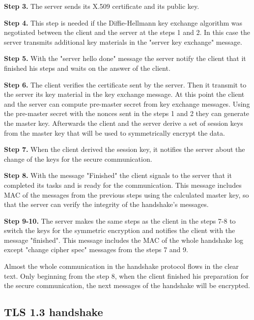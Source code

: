 \textbf{Step 3.} The server sends its X.509 certificate and its public key.

\textbf{Step 4.} This step is needed if the Diffie-Hellmann key exchange algorithm was negotiated between the client and the server at the steps 1 and 2. In this case the server transmits additional key materials in the "server key exchange" message.

\textbf{Step 5.} With the "server hello done" message the server notify the client that it finished his steps and waits on the answer of the client.

\textbf{Step 6.} The client verifies the certificate sent by the server. Then it transmit to the server its key material in the key exchange message. 
At this point the client and the server can compute pre-master secret from key exchange messages. Using the pre-master secret with the nonces sent in the steps 1 and 2 they can generate the master key. Afterwards the client and the server derive a set of session keys from the master key that will be used to symmetrically encrypt the data.

\textbf{Step 7.} When the client derived the session key, it notifies the server about the change of the keys for the secure communication.

\textbf{Step 8.} With the message "Finished" the client signals to the server that it completed its tasks and is ready for the communication. This message includes MAC of the messages from the previous steps using the calculated master key, so that the server can verify the integrity of the handshake's messages.

\textbf{Step 9-10.} The server makes the same steps as the client in the steps 7-8 to switch the keys for the symmetric encryption and notifies the client with the message "finished". This message includes the MAC of the whole handshake log except "change cipher spec" messages from the steps 7 and 9. \cite{sslstore:handshake}\cite{Hassenstein}

Almost the whole communication in the handshake protocol flows in the clear text. Only beginning from the step 8, when the client finished his preparation for the secure communication, the next messages of the handshake will be encrypted.

\subsection{TLS 1.3 handshake}
\label{subsec:handshake1_3}

